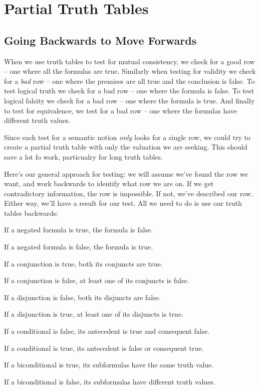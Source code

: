 \documentclass[PHIL101-Textbook.tex]{subfiles}
\begin{document}
\chapter{Partial Truth Tables}
\label{ch:PartialTruthTable}

\section{Going Backwards to Move Forwards}
When we use truth tables to test for mutual consistency, we check for a good row -- one where all the formulas are true. Similarly when testing for validity we check for a \emph{bad} row -- one where the premises are all true and the conclusion is false. To test logical truth we check for a bad row -- one where the formula is false. To test logical falsity we check for a bad row -- one where the formula is true. And finally to test for equivalence, we test for a bad row -- one where the formulas have different truth values.

Since each test for a semantic notion \emph{only} looks for a single row, we could try to create a partial truth table with only the valuation we are seeking. This should save a lot fo work, particualry for long truth tables.

Here's our general approach for testing: we will assume we've found the row we want, and work backwards to identify what row we are on. If we get contradictory information, the row is impossible. If not, we've described our row. Either way, we'll have a result for our test. All we need to do is use our truth tables backwards:

\begin{earg}
	\item If a negated formula is true, the formula is false.
	\item If a negated formula is false, the formula is true.
	\item If a conjunction is true, both its conjuncts are true.
	\item If a conjunction is false, at least one of its conjuncts is false.
	\item If a disjunction is false, both its disjuncts are false.
	\item If a disjunction is true, at least one of its disjuncts is true.
	\item If a conditional is false, its antecedent is true and consequent false.
	\item If a conditional is true, its antecedent is false or consequent true.
	\item If a biconditional is true, its subformulas have the same truth value.
	\item If a biconditional is false, its subformulas have different truth values.
\end{earg}
\end{document}
